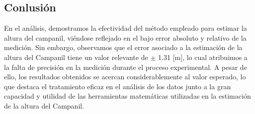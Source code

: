 \documentclass[10pt,a4paper]{article}
\begin{document}
\begin{multicols}{2}
\section{Conlusión}
En el análisis, demostramos la efectividad del método empleado para estimar la altura del campanil, viéndose reflejado en el bajo error absoluto y relativo de la medición. Sin embargo, observamos que el error asociado a la estimación de la altura del Campanil tiene un valor relevante de $\pm$ 1.31 [m], lo cual atribuimos a la falta de precisión en la medición durante el proceso experimental. A pesar de ello, los resultados obtenidos se acercan considerablemente al valor esperado, lo que destaca el tratamiento eficaz en el análisis de los datos junto a la gran capacidad y utilidad de las herramientas matemáticas utilizadas en la estimación de la altura del Campanil.



	
	
	
	\end{multicols}
\end{document}
